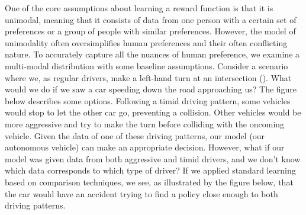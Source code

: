 \documentclass[
  letterpaper,
  DIV=11,
  numbers=noendperiod,
  oneside]{scrreprt}
\theoremstyle{remark}
\begin{document}
One of the core assumptions about learning a reward function is that it
is unimodal, meaning that it consists of data from one person with a
certain set of preferences or a group of people with similar
preferences. However, the model of unimodality often oversimplifies
human preferences and their often conflicting nature. To accurately
capture all the nuances of human preference, we examine a multi-modal
distribution with some baseline assumptions. Consider a scenario where
we, as regular drivers, make a left-hand turn at an intersection
(). What would we do if
we saw a car speeding down the road approaching us? The figure below
describes some options. Following a timid driving pattern, some vehicles
would stop to let the other car go, preventing a collision. Other
vehicles would be more aggressive and try to make the turn before
colliding with the oncoming vehicle. Given the data of one of these
driving patterns, our model (our autonomous vehicle) can make an
appropriate decision. However, what if our model was given data from
both aggressive and timid drivers, and we don't know which data
corresponds to which type of driver? If we applied standard learning
based on comparison techniques, we see, as illustrated by the figure
below, that the car would have an accident trying to find a policy close
enough to both driving patterns.
\end{document}
